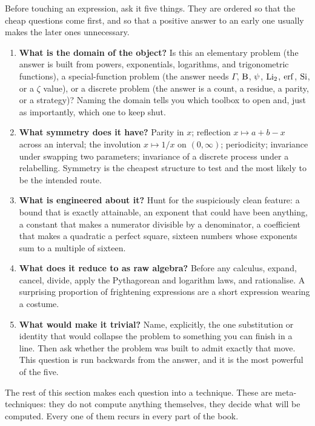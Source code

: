 Before touching an expression, ask it five things. They are ordered so that the cheap questions come first, and so that a positive answer to an early one usually makes the later ones unnecessary.

\begin{enumerate}
\item \textbf{What is the domain of the object?} Is this an elementary problem (the answer is built from powers, exponentials, logarithms, and trigonometric functions), a special-function problem (the answer needs $\Gamma$, $\mathrm{B}$, $\psi$, $\operatorname{Li}_{2}$, $\operatorname{erf}$, $\operatorname{Si}$, or a $\zeta$ value), or a discrete problem (the answer is a count, a residue, a parity, or a strategy)? Naming the domain tells you which toolbox to open and, just as importantly, which one to keep shut.
\item \textbf{What symmetry does it have?} Parity in $x$; reflection $x\mapsto a+b-x$ across an interval; the involution $x\mapsto 1/x$ on $(0,\infty)$; periodicity; invariance under swapping two parameters; invariance of a discrete process under a relabelling. Symmetry is the cheapest structure to test and the most likely to be the intended route.
\item \textbf{What is engineered about it?} Hunt for the suspiciously clean feature: a bound that is exactly attainable, an exponent that could have been anything, a constant that makes a numerator divisible by a denominator, a coefficient that makes a quadratic a perfect square, sixteen numbers whose exponents sum to a multiple of sixteen.
\item \textbf{What does it reduce to as raw algebra?} Before any calculus, expand, cancel, divide, apply the Pythagorean and logarithm laws, and rationalise. A surprising proportion of frightening expressions are a short expression wearing a costume.
\item \textbf{What would make it trivial?} Name, explicitly, the one substitution or identity that would collapse the problem to something you can finish in a line. Then ask whether the problem was built to admit exactly that move. This question is run backwards from the answer, and it is the most powerful of the five.
\end{enumerate}

The rest of this section makes each question into a technique. These are meta-techniques: they do not compute anything themselves, they decide what will be computed. Every one of them recurs in every part of the book.

